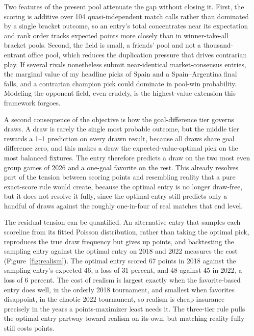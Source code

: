 \documentclass[11pt,letterpaper]{article}
\begin{document}
Two features of the present pool attenuate the gap without closing it. First, the scoring is additive over 104 quasi-independent match calls rather than dominated by a single bracket outcome, so an entry's total concentrates near its expectation and rank order tracks expected points more closely than in winner-take-all bracket pools. Second, the field is small, a friends' pool and not a thousand-entrant office pool, which reduces the duplication pressure that drives contrarian play. If several rivals nonetheless submit near-identical market-consensus entries, the marginal value of my headline picks of Spain and a Spain--Argentina final falls, and a contrarian champion pick could dominate in pool-win probability. Modeling the opponent field, even crudely, is the highest-value extension this framework forgoes.

A second consequence of the objective is how the goal-difference tier governs draws. A draw is rarely the single most probable outcome, but the middle tier rewards a 1--1 prediction on every drawn result, because all draws share goal difference zero, and this makes a draw the expected-value-optimal pick on the most balanced fixtures. The entry therefore predicts a draw on the two most even group games of 2026 and a one-goal favorite on the rest. This already resolves part of the tension between scoring points and resembling reality that a pure exact-score rule would create, because the optimal entry is no longer draw-free, but it does not resolve it fully, since the optimal entry still predicts only a handful of draws against the roughly one-in-four of real matches that end level.

The residual tension can be quantified. An alternative entry that samples each scoreline from its fitted Poisson distribution, rather than taking the optimal pick, reproduces the true draw frequency but gives up points, and backtesting the sampling entry against the optimal entry on 2018 and 2022 measures the cost (Figure~\ref{fig:realism}). The optimal entry scored 67 points in 2018 against the sampling entry's expected 46, a loss of 31 percent, and 48 against 45 in 2022, a loss of 6 percent. The cost of realism is largest exactly when the favorite-based entry does well, in the orderly 2018 tournament, and smallest when favorites disappoint, in the chaotic 2022 tournament, so realism is cheap insurance precisely in the years a points-maximizer least needs it. The three-tier rule pulls the optimal entry partway toward realism on its own, but matching reality fully still costs points.
\end{document}
